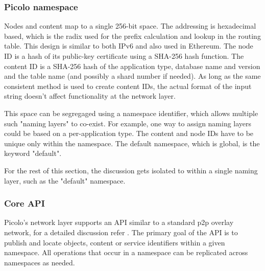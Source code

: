 \subsubsection{Picolo namespace} 
\label{net:namespace}

Nodes and content map to a single 256-bit space. The addressing is hexadecimal based, which is the radix used for the
prefix calculation and lookup in the routing table. This design is similar to both IPv6 and also used in Ethereum.  The
node ID is a hash of its public-key certificate using a SHA-256 hash function. The content ID is a SHA-256 hash of the
application type, database name and version and the table name (and possibly a shard number if needed). As long as the
same consistent method is used to create content IDs, the actual format of the input string doesn't affect functionality
at the network layer.

This space can be segregaged using a namespace identifier, which allows multiple such "naming layers" to co-exist. For
example, one way to assign naming layers could be based on a per-application type. The content and node IDs have to be
unique only within the namespace. The default namespace, which is global, is the keyword "default".

For the rest of this section, the discussion gets isolated to within a single naming layer, such as the "default"
namespace.

\subsubsection{Core API}
\label{net:core_api}
Picolo's network layer supports an API similar to a standard p2p overlay network, for a detailed discussion refer
\cite{dolr2003}. The primary goal of the API is to publish and locate objects, content or service identifiers within a given
namespace. All operations that occur in a namespace can be replicated across namespaces as needed.

